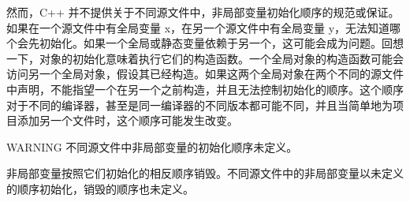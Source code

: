 然而，C++ 并不提供关于不同源文件中，非局部变量初始化顺序的规范或保证。如果在一个源文件中有全局变量 x，在另一个源文件中有全局变量 y，无法知道哪个会先初始化。如果一个全局或静态变量依赖于另一个，这可能会成为问题。回想一下，对象的初始化意味着执行它们的构造函数。一个全局对象的构造函数可能会访问另一个全局对象，假设其已经构造。如果这两个全局对象在两个不同的源文件中声明，不能指望一个在另一个之前构造，并且无法控制初始化的顺序。这个顺序对于不同的编译器，甚至是同一编译器的不同版本都可能不同，并且当简单地为项目添加另一个文件时，这个顺序可能发生改变。

\begin{myWarning}{WARNING}
不同源文件中非局部变量的初始化顺序未定义。
\end{myWarning}


非局部变量按照它们初始化的相反顺序销毁。不同源文件中的非局部变量以未定义的顺序初始化，销毁的顺序也未定义。




















